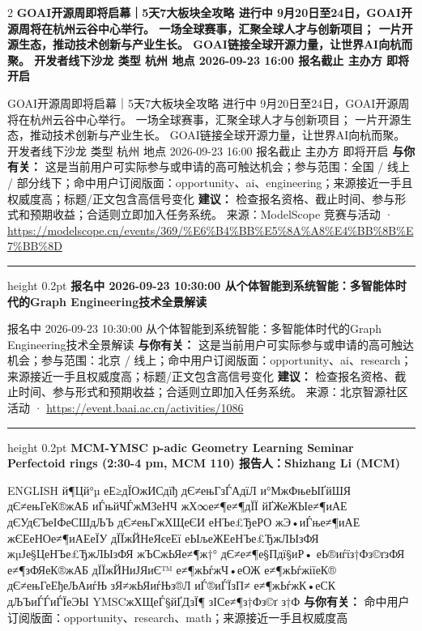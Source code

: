 \documentclass[10.5pt]{ctexart}
\begin{document}
\begin{multicols}{2}
{\large\bfseries GOAI开源周即将启幕｜5天7大板块全攻略 进行中 9月20日至24日，GOAI开源周将在杭州云谷中心举行。 一场全球赛事，汇聚全球人才与创新项目； 一片开源生态，推动技术创新与产业生长。 GOAI链接全球开源力量，让世界AI向杭而聚。 开发者线下沙龙 类型 杭州 地点 2026-09-23 16:00 报名截止 主办方 即将开启}\par
GOAI开源周即将启幕｜5天7大板块全攻略 进行中 9月20日至24日，GOAI开源周将在杭州云谷中心举行。 一场全球赛事，汇聚全球人才与创新项目； 一片开源生态，推动技术创新与产业生长。 GOAI链接全球开源力量，让世界AI向杭而聚。 开发者线下沙龙 类型 杭州 地点 2026-09-23 16:00 报名截止 主办方 即将开启
\textbf{与你有关：} 这是当前用户可实际参与或申请的高可触达机会；参与范围：全国 / 线上 / 部分线下；命中用户订阅版面：opportunity、ai、engineering；来源接近一手且权威度高；标题/正文包含高信号变化
\textbf{建议：} 检查报名资格、截止时间、参与形式和预期收益；合适则立即加入任务系统。
{\footnotesize\color{ormuted} 来源：ModelScope 竞赛与活动 · \url{https://modelscope.cn/events/369/%E6%B4%BB%E5%8A%A8%E4%BB%8B%E7%BB%8D}}
\vspace{2mm}
\hrule height 0.2pt
\vspace{2mm}
{\large\bfseries 报名中 2026-09-23 10:30:00 从个体智能到系统智能：多智能体时代的Graph Engineering技术全景解读}\par
报名中 2026-09-23 10:30:00 从个体智能到系统智能：多智能体时代的Graph Engineering技术全景解读
\textbf{与你有关：} 这是当前用户可实际参与或申请的高可触达机会；参与范围：北京 / 线上；命中用户订阅版面：opportunity、ai、research；来源接近一手且权威度高；标题/正文包含高信号变化
\textbf{建议：} 检查报名资格、截止时间、参与形式和预期收益；合适则立即加入任务系统。
{\footnotesize\color{ormuted} 来源：北京智源社区活动 · \url{https://event.baai.ac.cn/activities/1086}}
\vspace{2mm}
\hrule height 0.2pt
\vspace{2mm}
{\large\bfseries MCM-YMSC p-adic Geometry Learning Seminar Perfectoid rings (2:30-4 pm, MCM 110) 报告人：Shizhang Li (MCM)}\par
ENGLISH й¶Цй°µ еЕ≥дЇОжИСдїђ дЄ≠ењГзЃАдїЛ и°МжФњеЫҐйШЯ дЄ≠ењГеК®жАБ иЃњйЧЃжМЗеНЧ жХ∞е≠¶е≠¶дЇЇ йҐЖеЖЫе≠¶иАЕ дЄУдЄЪеІФеСШдЉЪ дЄ≠ењГжХЩеЄИ еНЪе£ЂеРО жЭ•иЃње≠¶иАЕ жЄЕеНОе≠¶иАЕеЇУ дЇЇжЙНеЯєеЕї еЫљеЖЕеНЪе£ЂжЛЫзФЯ жµЈе§ЦеНЪе£ЂжЛЫзФЯ жЪСжЬЯе≠¶ж†° дЄ≠е≠¶е§Пдї§иР• еЬ®иѓїз†Фз©ґзФЯ е≠¶зФЯеК®жАБ дЇЇжЙНиЈЯиЄ™ е≠¶жЬѓжЧ•еОЖ е≠¶жЬѓжіїеК® дЄ≠ењГеЕђеЉАиѓЊ зЯ≠жЬЯиѓЊз®Л иЃ®иЃЇзП≠ е≠¶жЬѓжК•еСК дЉЪиЃЃиЃЇеЭЫ YMSCжХЩеЃ§йҐДзЇ¶ зІСе≠¶з†Фз©ґ з†Ф
\textbf{与你有关：} 命中用户订阅版面：opportunity、research、math；来源接近一手且权威度高

\end{multicols}
\end{document}
